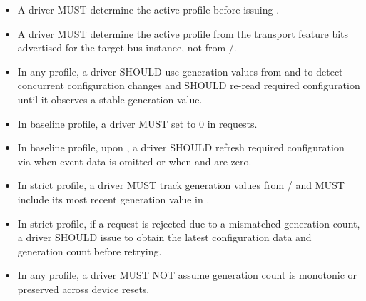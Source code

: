 \begin{itemize}
  \item A driver MUST determine the active profile before issuing
        .
  \item A driver MUST determine the active profile from the transport feature
        bits advertised for the target bus instance, not from
        /.
  \item In any profile, a driver SHOULD use generation values from
         and  to detect concurrent
        configuration changes and SHOULD re-read required configuration until
        it observes a stable generation value.
  \item In baseline profile, a driver MUST set  to 0 in
         requests.
  \item In baseline profile, upon , a driver SHOULD refresh
        required configuration via  when event data is
        omitted or when  and  are zero.
  \item In strict profile, a driver MUST track generation values from
        / and MUST include its most
        recent generation value in .
  \item In strict profile, if a  request is rejected due to a
        mismatched generation count, a driver SHOULD issue 
        to obtain the latest configuration data and generation count before
        retrying.
  \item In any profile, a driver MUST NOT assume generation count is monotonic
        or preserved across device resets.
\end{itemize}

